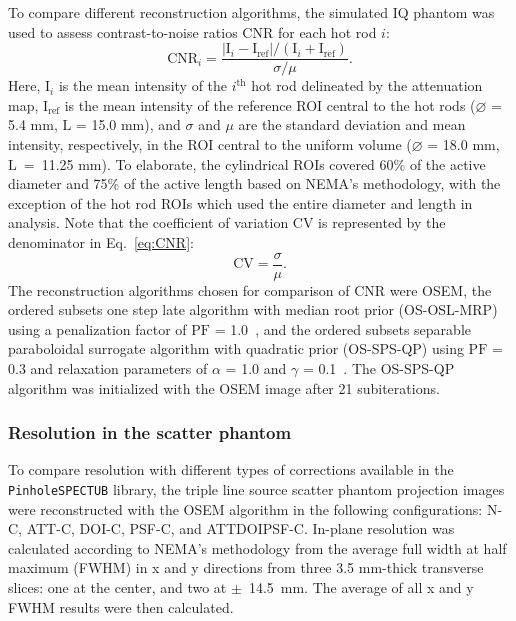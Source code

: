 \documentclass[utf8]{FrontiersinHarvard} %
\begin{document}
To compare different reconstruction algorithms, the simulated IQ phantom was used to assess contrast-to-noise ratios $\mathrm{CNR}$ for each hot rod $i$:
\begin{equation}\label{eq:CNR}
	\mathrm{CNR}_i = \frac{|\mathrm{I}_i - \mathrm{I}_\mathrm{ref}|/(\mathrm{I}_i + \mathrm{I}_\mathrm{ref})}{\sigma / \mu}.
\end{equation}
Here, $\mathrm{I}_i$ is the mean intensity of the $i^\mathrm{th}$ hot rod delineated by the attenuation map, $\mathrm{I}_\mathrm{ref}$ is the mean intensity of the reference ROI central to the hot rods ($\diameter$ = 5.4 mm, $\mathrm{L}$ = 15.0 mm), and $\sigma$ and $\mu$ are the standard deviation and mean intensity, respectively, in the ROI central to the uniform volume ($\diameter$ = 18.0 mm, $\mathrm{L}$~=~11.25 mm). To elaborate, the cylindrical ROIs covered 60\% of the active diameter and 75\% of the active length based on NEMA's methodology, with the exception of the hot rod ROIs which used the entire diameter and length in analysis. Note that the coefficient of variation $\mathrm{CV}$ is represented by the denominator in Eq.~\ref{eq:CNR}:
\begin{equation}\label{eq:CV}
\mathrm{CV} = \frac{\sigma}{\mu}.
\end{equation}
The reconstruction algorithms chosen for comparison of $\mathrm{CNR}$ were OSEM, the ordered subsets one step late algorithm with median root prior (OS-OSL-MRP) using a penalization factor of $\mathrm{PF}$ = 1.0~\cite{ososlmrp}, and the ordered subsets separable paraboloidal surrogate algorithm with quadratic prior (OS-SPS-QP) using $\mathrm{PF}$ = 0.3 and relaxation parameters of $\alpha$ = 1.0 and $\gamma$ = 0.1~\cite{osspsqp}. The OS-SPS-QP algorithm was initialized with the OSEM image after 21 subiterations.

\subsubsection{Resolution in the scatter phantom}

To compare resolution with different types of corrections available in the \texttt{PinholeSPECTUB} library, the triple line source scatter phantom projection images were reconstructed with the OSEM algorithm in the following configurations: N-C, ATT-C, DOI-C, PSF-C, and ATTDOIPSF-C. In-plane resolution was calculated according to NEMA's methodology from the average full width at half maximum (FWHM) in x and y directions from three 3.5 mm-thick transverse slices: one at the center, and two at $\pm$~14.5~mm. The average of all x and y FWHM results were then calculated.
\end{document}
